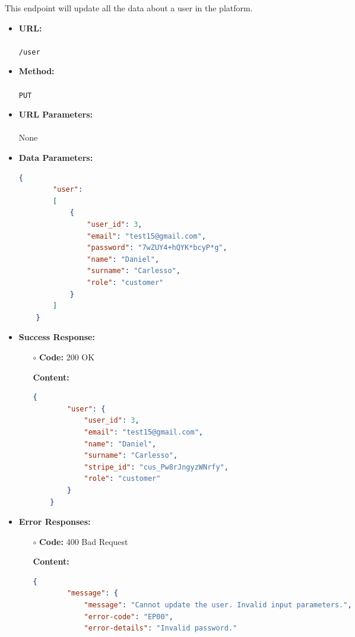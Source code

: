 

This endpoint will update all the data about a user in the platform.

\begin{itemize}
    \item \textbf{URL:} \\\\\texttt{/user}
    \item \textbf{Method:} \\\\\texttt{PUT}
    \item \textbf{URL Parameters:} \\\\None
    \item \textbf{Data Parameters:}
	\begin{lstlisting}[language=json]
    {
        "user":
        [   
            {
                "user_id": 3,
                "email": "test15@gmail.com",
                "password": "7wZUY4+hQYK*bcyP*g",
                "name": "Daniel",
                "surname": "Carlesso",
                "role": "customer"
            }
        ]
    }
	\end{lstlisting}
    \item \textbf{Success Response:}
		\begin{itemize}
			\item[$\circ$] \textbf{Code:} 200 OK
			\item[] \textbf{Content:}
			\begin{lstlisting}[language=json]
    {
        "user": {
            "user_id": 3,
            "email": "test15@gmail.com",
            "name": "Daniel",
            "surname": "Carlesso",
            "stripe_id": "cus_Pw8rJngyzWNrfy",
            "role": "customer"
        }
    }
			\end{lstlisting}
		\end{itemize}
	   \item \textbf{Error Responses:}
    	\begin{itemize}
			\item[$\circ$] \textbf{Code:} 400 Bad Request
			\item[] \textbf{Content:}
			\begin{lstlisting}[language=json]
    {
        "message": {
            "message": "Cannot update the user. Invalid input parameters.",
            "error-code": "EP00",
            "error-details": "Invalid password."

\end{lstlisting}
\end{itemize}
\end{itemize}
